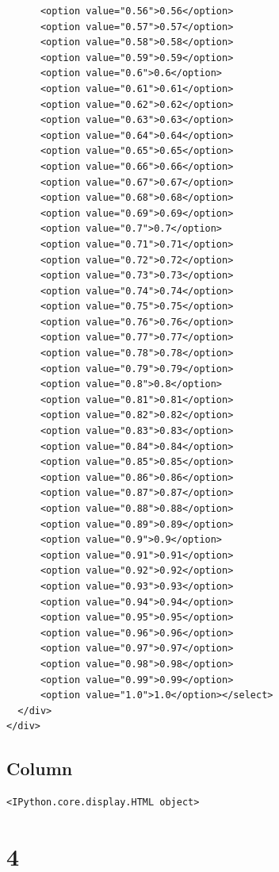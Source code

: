 \documentclass[
  letterpaper,
  DIV=11,
  numbers=noendperiod]{scrartcl}
\begin{document}
\begin{verbatim}
      <option value="0.56">0.56</option>
      <option value="0.57">0.57</option>
      <option value="0.58">0.58</option>
      <option value="0.59">0.59</option>
      <option value="0.6">0.6</option>
      <option value="0.61">0.61</option>
      <option value="0.62">0.62</option>
      <option value="0.63">0.63</option>
      <option value="0.64">0.64</option>
      <option value="0.65">0.65</option>
      <option value="0.66">0.66</option>
      <option value="0.67">0.67</option>
      <option value="0.68">0.68</option>
      <option value="0.69">0.69</option>
      <option value="0.7">0.7</option>
      <option value="0.71">0.71</option>
      <option value="0.72">0.72</option>
      <option value="0.73">0.73</option>
      <option value="0.74">0.74</option>
      <option value="0.75">0.75</option>
      <option value="0.76">0.76</option>
      <option value="0.77">0.77</option>
      <option value="0.78">0.78</option>
      <option value="0.79">0.79</option>
      <option value="0.8">0.8</option>
      <option value="0.81">0.81</option>
      <option value="0.82">0.82</option>
      <option value="0.83">0.83</option>
      <option value="0.84">0.84</option>
      <option value="0.85">0.85</option>
      <option value="0.86">0.86</option>
      <option value="0.87">0.87</option>
      <option value="0.88">0.88</option>
      <option value="0.89">0.89</option>
      <option value="0.9">0.9</option>
      <option value="0.91">0.91</option>
      <option value="0.92">0.92</option>
      <option value="0.93">0.93</option>
      <option value="0.94">0.94</option>
      <option value="0.95">0.95</option>
      <option value="0.96">0.96</option>
      <option value="0.97">0.97</option>
      <option value="0.98">0.98</option>
      <option value="0.99">0.99</option>
      <option value="1.0">1.0</option></select>
  </div>
</div>
\end{verbatim}

\subsection{Column}\label{column-2}

\label{shiny_gaussian_abbe_hybrid_simulation}
\begin{verbatim}
<IPython.core.display.HTML object>
\end{verbatim}

\section{4}\label{section-6}
\end{document}
